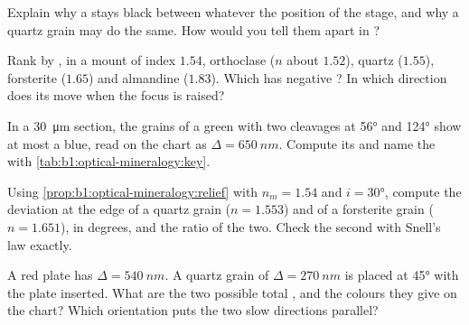\begin{exercise}[$\star$]\label{exo:b1:optical-mineralogy:3}
Explain why a  stays black between  whatever the position
of the stage, and why a quartz grain may do the same. How would you tell
them apart in ?
\end{exercise}

\begin{exercise}[$\star$]\label{exo:b1:optical-mineralogy:4}
Rank by , in a mount of index $1.54$, orthoclase ($n$ about $1.52$),
quartz ($1.55$), forsterite ($1.65$) and almandine ($1.83$). Which has negative
? In which direction does its  move when the focus is
raised?
\end{exercise}

\begin{exercise}[$\star\star$]\label{exo:b1:optical-mineralogy:5}
In a \qty{30}{\micro m} section, the grains of a green   with
two cleavages at \ang{56} and \ang{124} show at most a  blue,
read on the chart as $\Delta = \qty{650}{nm}$. Compute its  and
name the  with \cref{tab:b1:optical-mineralogy:key}.
\end{exercise}

\begin{exercise}[$\star\star$]\label{exo:b1:optical-mineralogy:6}
Using \cref{prop:b1:optical-mineralogy:relief} with $n_m = 1.54$ and
$i = \ang{30}$, compute the deviation at the edge of a quartz grain
($n = 1.553$) and of a forsterite grain ($n = 1.651$), in degrees, and the
ratio of the two. Check the second with Snell's law exactly.
\end{exercise}

\begin{exercise}[$\star\star$]\label{exo:b1:optical-mineralogy:7}
A  red plate has $\Delta = \qty{540}{nm}$. A quartz grain of
$\Delta = \qty{270}{nm}$ is placed at \ang{45} with the plate inserted. What
are the two possible total , and the colours they give on the
chart? Which orientation puts the two slow directions parallel?
\end{exercise}

